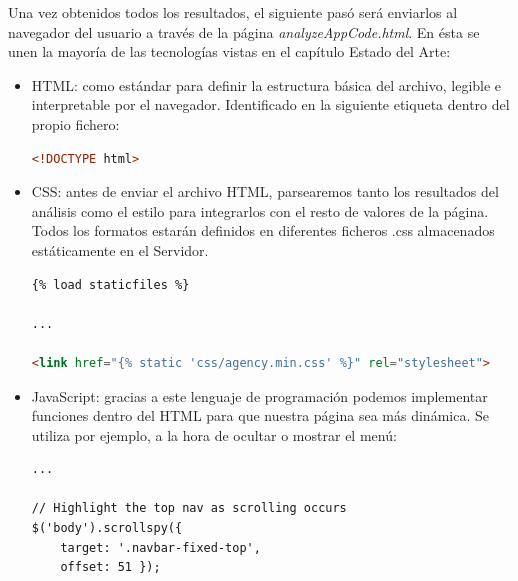 \documentclass[a4paper, 12pt]{book}
\begin{document}
Una vez obtenidos todos los resultados, el siguiente pasó será enviarlos al navegador del usuario a través de la página \textit{analyzeAppCode.html}. En ésta se unen la mayoría de las tecnologías vistas en el capítulo Estado del Arte:
\begin{itemize}
	\item HTML: como estándar para definir la estructura básica del archivo, legible e interpretable por el navegador. Identificado en la siguiente etiqueta dentro del propio fichero:	
		\begin{lstlisting}[language=HTML]
<!DOCTYPE html>
		\end{lstlisting}
	\item CSS: antes de enviar el archivo HTML, parsearemos tanto los resultados del análisis como el estilo para integrarlos con el resto de valores de la página. Todos los formatos estarán definidos en diferentes ficheros .css almacenados estáticamente en el Servidor.  
		\begin{lstlisting}[language=HTML]
{% load staticfiles %}

...

<link href="{% static 'css/agency.min.css' %}" rel="stylesheet">
		\end{lstlisting}
	\item JavaScript: gracias a este lenguaje de programación podemos implementar funciones dentro del HTML para que nuestra página sea más dinámica. Se utiliza por ejemplo, a la hora de ocultar o mostrar el menú:
	\begin{lstlisting}[language=HTML]
... 

// Highlight the top nav as scrolling occurs
$('body').scrollspy({
	target: '.navbar-fixed-top',
	offset: 51 });


\end{lstlisting}
\end{itemize}
\end{document}
